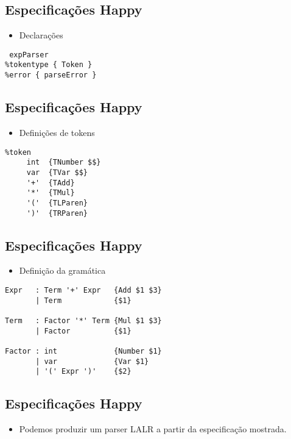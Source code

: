 \documentclass[11pt]{article}
\begin{document}
\subsection*{Especificações Happy}
\label{sec:org4751114}

\begin{itemize}
\item Declarações
\end{itemize}

\begin{verbatim}
 expParser
%tokentype { Token }
%error { parseError }
\end{verbatim}
\subsection*{Especificações Happy}
\label{sec:org09d2062}

\begin{itemize}
\item Definições de tokens
\end{itemize}

\begin{verbatim}
%token
     int  {TNumber $$}
     var  {TVar $$}
     '+'  {TAdd}
     '*'  {TMul}
     '('  {TLParen}
     ')'  {TRParen}
\end{verbatim}
\subsection*{Especificações Happy}
\label{sec:org305efda}

\begin{itemize}
\item Definição da gramática
\end{itemize}

\begin{verbatim}
Expr   : Term '+' Expr   {Add $1 $3}
       | Term            {$1}

Term   : Factor '*' Term {Mul $1 $3}
       | Factor          {$1}

Factor : int             {Number $1}
       | var             {Var $1}
       | '(' Expr ')'    {$2}
\end{verbatim}
\subsection*{Especificações Happy}
\label{sec:org34a5cfe}

\begin{itemize}
\item Podemos produzir um parser LALR a partir da especificação mostrada.
\end{itemize}
\end{document}
